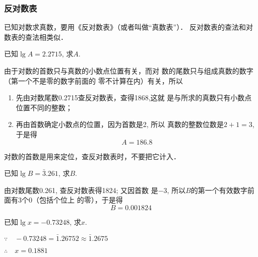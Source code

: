 \subsubsection{反对数表}
已知对数求真数，要用《反对数表》（或者叫做“真数表”）．
反对数表的查法和对数表的查法相类似．



    



\begin{example}
    已知$\lg A=2.2715$, 求$A$.
\end{example}

\begin{solution}
    由于对数的首数只与真数的小数点位置有关，而对
数的尾数只与组成真数的数字（第一个不是零的数字前面的
零不计算在内）有关，所以
\begin{enumerate}
    \item 先由对数尾数0.2715查反对数表，查得1868,这就
    是与所求的真数只有小数点位置不同的整数；
    \item 再由首数确定小数点的位置，因为首数是2, 所以
    真数的整数位数是$2+1=3$, 于是得
    $$A=186.8$$
\end{enumerate}
\end{solution}    

\begin{rmk}
    对数的首数是用来定位，查反对数表时，不要把它计入．
\end{rmk}


\begin{example}
   已知$\lg B=\bar{3}.261$, 求$B$. 
\end{example}

\begin{solution}
由对数尾数0.261, 查反对数表得1824; 又因首数
    是$-3$, 所以$B$的第一个有效数字前面有3个0（包括个位上
    的零），于是得
    \[B=0.001824\]
\end{solution}    

\begin{example}
    已知$\lg x=-0.73248$, 求$x$.
\end{example}

\begin{solution}
$\because\quad -0.73248=\bar{1}.26752\approx \bar{1}.2675$

$\therefore\quad x=0.1881$
\end{solution}  

